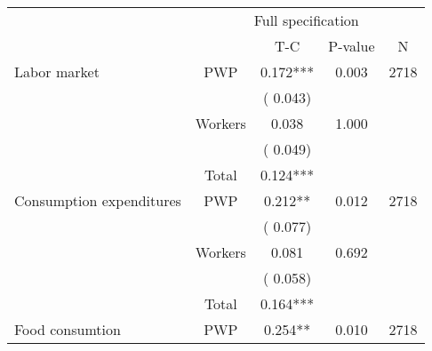 
\begin{tabular}{l*{4}{c}}\hline&\multicolumn{4}{c}{Full specification} \\ \cmidrule(r){2-5} & {} & {T-C} & {P-value} & {N}  \\ \midrule
 Labor market                 &       PWP     &              0.172***                 &        0.003    & 2718                               \\  
                               &                               &       (       0.043)                              & &                                                                             \\ 
                               &       Workers         &              0.038                 &        1.000    &                                               \\ 
                               &                               &       (       0.049)                              & &                                                                             \\ 
\cmidrule{2-3}
                               &       Total           &              0.124***                 &    &                                               \\ 
\cmidrule{2-3}
 Consumption expenditures                 &       PWP     &              0.212**                 &        0.012    & 2718                               \\ 
                               &                               &       (       0.077)                              & &                                                                             \\ 
                               &       Workers         &              0.081                 &        0.692    &                                               \\ 
                               &                               &       (       0.058)                              & &                                                                             \\ 
\cmidrule{2-3}
                               &       Total           &              0.164***                 &    &                                               \\ 
\cmidrule{2-3}
 Food consumtion                 &       PWP     &              0.254**                 &        0.010    & 2718                               \\ 

\end{tabular}

